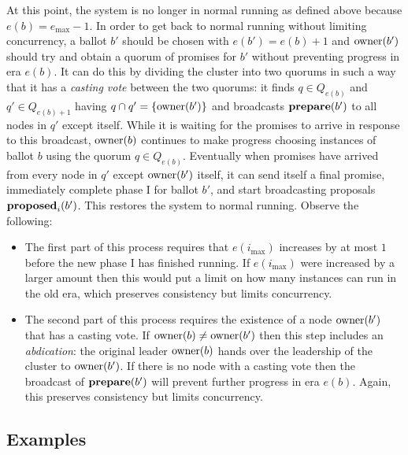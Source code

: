 \documentclass[journal]{IEEEtran}
\begin{document}
At this point, the system is no longer in normal running as defined above
because $e(b) = e_\mathrm{max} - 1$. In order to get back to normal running
without limiting concurrency, a ballot $b'$ should be chosen with $e(b') = e(b)
+ 1$ and $\mathrm{owner}(b')$ should try and obtain a quorum of promises for $b'$
without preventing progress in era $e(b)$. It can do this by dividing the
cluster into two quorums in such a way that it has a \textit{casting vote}
between the two quorums: it finds $q \in Q_{e(b)}$ and $q' \in Q_{e(b)+1}$
having $q \cap q' = \{\mathrm{owner}(b')\}$ and broadcasts $\mathbf{prepare}(b')$ to all nodes in
$q'$ except itself. While it is waiting for the promises to arrive in response
to this broadcast, $\mathrm{owner}(b)$ continues to make progress choosing instances of
ballot $b$ using the quorum $q \in Q_{e(b)}$.  Eventually when promises have
arrived from every node in $q'$ except $\mathrm{owner}(b')$ itself, it can send itself
a final promise, immediately complete phase I for ballot $b'$, and start
broadcasting proposals $\mathbf{proposed}_{i}(b')$.  This restores the system to normal
running. Observe the following:
%
\begin{itemize}
%
\item The first part of this process requires that $e(i_\mathrm{max})$
increases by at most $1$ before the new phase I has finished running. If
$e(i_\mathrm{max})$ were increased by a larger amount then this would put a
limit on how many instances can run in the old era, which preserves consistency
but limits concurrency.
%
\item The second part of this process requires the existence of a node
$\mathrm{owner}(b')$ that has a casting vote. If $\mathrm{owner}(b) \ne \mathrm{owner}(b')$ then this
step includes an \textit{abdication}: the original leader $\mathrm{owner}(b)$ hands
over the leadership of the cluster to $\mathrm{owner}(b')$. If there is no node with a
casting vote then the broadcast of $\mathbf{prepare}(b')$ will prevent further progress in
era $e(b)$. Again, this preserves consistency but limits concurrency.
%
\end{itemize}

\subsection{Examples}\label{types-of-configuration-change}
\end{document}
